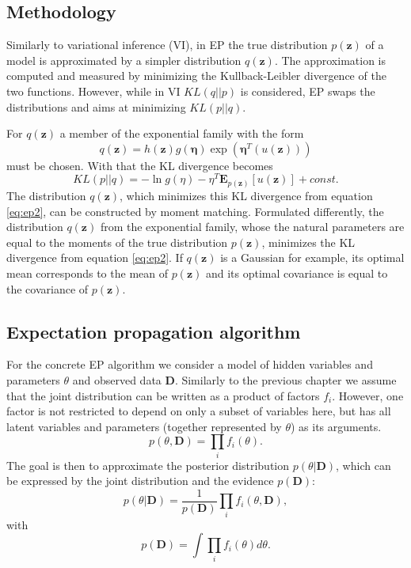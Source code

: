 \documentclass{sigkdd}
\begin{document}
\subsection{Methodology}
Similarly to variational inference (VI), in EP the true distribution $p(\mathbf{z})$ of a model is approximated by a simpler distribution $q(\mathbf{z})$. The approximation is computed and measured by minimizing the Kullback-Leibler divergence of the two functions. However, while in VI $KL(q||p)$ is considered, EP swaps the distributions and aims at minimizing $KL(p||q)$.

For $q(\mathbf{z})$ a member of the exponential family with the form
\begin{equation}\label{eq:ep1}
q(\mathbf{z}) = h(\mathbf{z})g(\mathbf{\eta}) \exp(\mathbf{\eta}^T(u(\mathbf{z})))
\end{equation}
must be chosen. With that the KL divergence becomes
\begin{equation}\label{eq:ep2}
KL(p||q)= - \ln g(\eta) - \eta^T \mathbf{E}_{p(\mathbf{z})} [u(\mathbf{z})] + const.
\end{equation}
The distribution $q(\mathbf{z})$, which minimizes this KL divergence from equation \ref{eq:ep2}, can be constructed by moment matching. Formulated differently, the distribution $q(\mathbf{z})$ from the exponential family, whose the natural parameters are equal to the moments of the true distribution $p(\mathbf{z})$, minimizes the KL divergence from equation \ref{eq:ep2}. If $q(\mathbf{z})$ is a Gaussian for example, its optimal mean corresponds to the mean of $p(\mathbf{z})$ and its optimal covariance is equal to the covariance of $p(\mathbf{z})$.

\subsection{Expectation propagation algorithm}
For the concrete EP algorithm we consider a model of hidden variables and parameters $\theta$ and observed data $\mathbf{D}$. Similarly to the previous chapter we assume that the joint distribution can be written as a product of factors $f_i$. However, one factor is not restricted to depend on only a subset of variables here, but has all latent variables and parameters (together represented by $\theta$) as its arguments.
\begin{equation}\label{eq:ep3}
p(\theta, \mathbf{D}) = \prod_i f_i(\theta).
\end{equation}
The goal is then to approximate the posterior distribution $p(\theta|\mathbf{D})$, which can be expressed by the joint distribution and the evidence $p(\mathbf{D})$:
\begin{equation}\label{eq:ep4}
p(\theta|\mathbf{D}) = \frac{1}{p(\mathbf{D})} \prod_i f_i(\theta , \mathbf{D}),
\end{equation}
with 
\begin{equation}\label{eq:ep5}
p(\mathbf{D}) = \int \prod_i f_i(\theta) d\theta.
\end{equation}  
\end{document}
